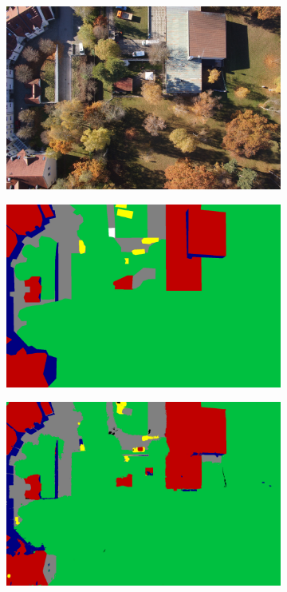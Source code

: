 \begin{figure}[htb]
\begin{subfigure}{0.243\columnwidth}
  \centering
  \includegraphics[width=1\linewidth]{fig/segmentation/DSC00793.JPG}
\end{subfigure}\vspace{1mm}
\begin{subfigure}{0.243\columnwidth}
  \centering
  \includegraphics[width=1\linewidth]{fig/segmentation/DSC00793.png}
\end{subfigure}
\begin{subfigure}{0.243\columnwidth}
  \centering
  \includegraphics[width=1\linewidth]{fig/segmentation/DSC00793_6000_manualcrf.png}

\end{subfigure}
\end{figure}
